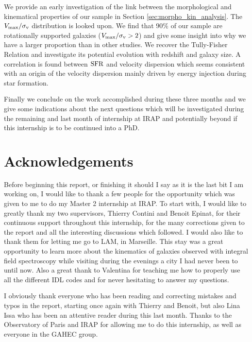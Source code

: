 \documentclass[a4paper, twoside, 11pt]{article}
\begin{document}
We provide an early investigation of the link between the morphological and kinematical properties of our sample in Section \ref{sec:morpho_kin_analysis}. The $V_{\rm{max}}/ \sigma_{\rm{v}}$ distribution is looked upon. We find that $90\%$ of our sample are rotationally supported galaxies ($V_{\rm{max}}/ \sigma_{\rm{v}} > 2$) and give some insight into why we have a larger proportion than in other studies. We recover the Tully-Fisher Relation and investigate its potential evolution with redshift and galaxy size. A correlation is found between $\rm{SFR}$ and velocity dispersion which seems consistent with an origin of the velocity dispersion mainly driven by energy injection during star formation.

Finally we conclude on the work accomplished during these three months and we give some indications about the next questions which will be investigated during the remaining and last month of internship at IRAP and potentially beyond if this internship is to be continued into a PhD.



\clearpage
{}
\tableofcontents
\clearpage
\listoffigures
\listoftables

\newpage
\section*{Acknowledgements}

Before beginning this report, or finishing it should I say as it is the last bit I am working on, I would like to thank a few people for the opportunity which was given to me to do my Master 2 internship at IRAP. To start with, I would like to greatly thank my two supervisors, Thierry Contini and Benoit Epinat, for their continuous support throughout this internship, for the many corrections given to the report and all the interesting discussions which followed. I would also like to thank them for letting me go to LAM, in Marseille. This stay was a great opportunity to learn more about the kinematics of galaxies observed with integral field spectroscopy while visiting during the evenings a city I had never been to until now. Also a great thank to Valentina for teaching me how to properly use all the different IDL codes and for never hesitating to answer my questions.

 I obviously thank everyone who has been reading and correcting mistakes and typos in the report, starting once again with Thierry and Benoit, but also Lina Issa who has been an attentive reader during this last month. Thanks to the Observatory of Paris and IRAP for allowing me to do this internship, as well as everyone in the GAHEC group.
 
\end{document}
